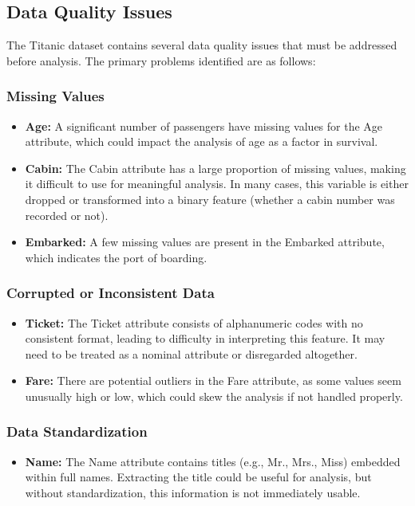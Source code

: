 \documentclass[twoside,11pt]{article}
\begin{document}
\subsection*{Data Quality Issues}
The Titanic dataset contains several data quality issues that must be addressed before analysis. The primary problems identified are as follows:

\subsubsection*{Missing Values}
\begin{itemize}
    \item \textbf{Age:} A significant number of passengers have missing values for the Age attribute, which could impact the analysis of age as a factor in survival.
    \item \textbf{Cabin:} The Cabin attribute has a large proportion of missing values, making it difficult to use for meaningful analysis. In many cases, this variable is either dropped or transformed into a binary feature (whether a cabin number was recorded or not).
    \item \textbf{Embarked:} A few missing values are present in the Embarked attribute, which indicates the port of boarding.
\end{itemize}

\subsubsection*{Corrupted or Inconsistent Data}
\begin{itemize}
    \item \textbf{Ticket:} The Ticket attribute consists of alphanumeric codes with no consistent format, leading to difficulty in interpreting this feature. It may need to be treated as a nominal attribute or disregarded altogether.
    \item \textbf{Fare:} There are potential outliers in the Fare attribute, as some values seem unusually high or low, which could skew the analysis if not handled properly.
\end{itemize}

\subsubsection*{Data Standardization}
\begin{itemize}
    \item \textbf{Name:} The Name attribute contains titles (e.g., Mr., Mrs., Miss) embedded within full names. Extracting the title could be useful for analysis, but without standardization, this information is not immediately usable.
\end{itemize}
\end{document}
